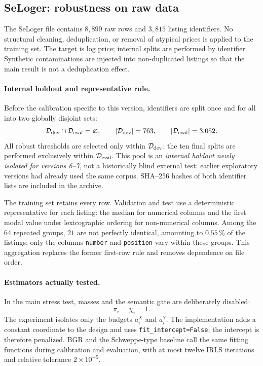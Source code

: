 \documentclass[10pt,a4paper]{article}
\begin{document}
\subsection{SeLoger: robustness on raw data}
\label{subsec:seloger}
The SeLoger file contains $8{,}899$ raw rows and $3{,}815$ listing identifiers. No structural cleaning, deduplication, or removal of atypical prices is applied to the training set. The target is log price; internal splits are performed by identifier. Synthetic contaminations are injected into non-duplicated listings so that the main result is not a deduplication effect.

\paragraph{Internal holdout and representative rule.}
Before the calibration specific to this version, identifiers are split once and for all into two globally disjoint sets:
\[
\mathcal D_{\rm dev}\cap\mathcal D_{\rm eval}=\varnothing,
\qquad
|\mathcal D_{\rm dev}|=763,
\qquad
|\mathcal D_{\rm eval}|=3{,}052.
\]
All robust thresholds are selected only within $\mathcal D_{\rm dev}$; the ten final splits are performed exclusively within $\mathcal D_{\rm eval}$. This pool is an \emph{internal holdout newly isolated for versions 6--7}, not a historically blind external test: earlier exploratory versions had already used the same corpus. SHA--256 hashes of both identifier lists are included in the archive.

The training set retains every row. Validation and test use a deterministic representative for each listing: the median for numerical columns and the first modal value under lexicographic ordering for non-numerical columns. Among the $64$ repeated groups, $21$ are not perfectly identical, amounting to $0.55\,\%$ of the listings; only the columns \texttt{number} and \texttt{position} vary within these groups. This aggregation replaces the former first-row rule and removes dependence on file order.

\paragraph{Estimators actually tested.}
In the main stress test, masses and the semantic gate are deliberately disabled:
\[
\boxed{\pi_i=\chi_i=1.}
\]
The experiment isolates only the budgets $a_i^X$ and $a_i^Y$. The implementation adds a constant coordinate to the design and uses \texttt{fit\_intercept=False}; the intercept is therefore penalized. BGR and the Schweppe-type baseline call the same fitting functions during calibration and evaluation, with at most twelve IRLS iterations and relative tolerance $2\times10^{-5}$.
\end{document}
